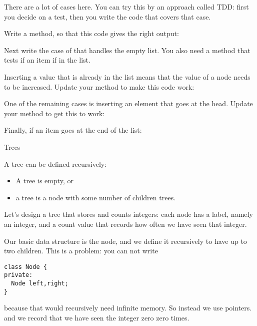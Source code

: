 There are a lot of cases here. You can try this by an approach called
\acf{TDD}: first you decide on a test, then you write the code that
covers that case.

\begin{exercise}
  Write a  method, so that this code gives the right
  output:
\end{exercise}

\begin{exercise}
  Next write the case of  that handles the empty
  list. You also need a method  that tests if an
  item if in the list.
\end{exercise}

\begin{exercise}
  Inserting a value that is already in the list means that the
   value of a node needs to be increased. Update your
   method to make this code work:
\end{exercise}

\begin{exercise}
  One of the remaining cases is inserting an element that goes at the
  head. Update your  method to get this to work:
\end{exercise}

\begin{exercise}
  Finally, if an item goes at the end of the list:
\end{exercise}

 {Trees}

\prerequisite{\ref{ch:pointer}}

A tree can be defined recursively:
\begin{itemize}
\item A tree is empty, or
\item a tree is a node with some number of children trees.
\end{itemize}
Let's design a tree that stores and counts integers: each node has a
label, namely an integer, and a count value that records how often we
have seen that integer.

Our basic data structure is the node, and we define it recursively to
have up to two children. This is a problem: you can not write
\begin{verbatim}
class Node {
private:
  Node left,right;
}
\end{verbatim}
because that would recursively need infinite memory. So instead we use pointers.
%
%
and we record that we have seen the integer zero zero times.

